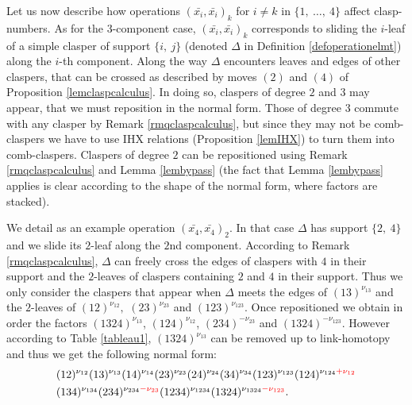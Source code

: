 \documentclass[11pt, a4paper, twoside,reqno]{amsart}
\begin{document}
Let us now describe how operations $(\bar{x_i},\bar{x_i})_k$ for $i\neq k$ in $\{1,\ \ldots,\ 4\}$ affect clasp-numbers. As for the $3$-component case, $(\bar{x_i},\bar{x_i})_k$ corresponds to sliding the $i$-leaf of a simple clasper of support $\{i,\ j\}$ (denoted $\Delta$ in Definition \ref{defoperationelmt}) along the $i$-th component. Along the way $\Delta$ encounters leaves and edges of other claspers, that can be crossed as described by moves $(2)$ and $(4)$ of Proposition \ref{lemclaspcalculus}. In doing so, claspers of degree $2$ and $3$ may appear, that we must reposition in the normal form. Those of degree $3$ commute with any clasper by Remark \ref{rmqclaspcalculus}, but since they may not be comb-claspers we have to use IHX relations (Proposition \ref{lemIHX}) to turn them into comb-claspers. Claspers of degree $2$ can be repositioned using Remark \ref{rmqclaspcalculus} and Lemma \ref{lembypass} (the fact that Lemma \ref{lembypass} applies is clear according to the shape of the normal form, where factors are stacked).

We detail as an example operation $(\bar{x_4},\bar{x_4})_2$. In that case $\Delta$ has support $\{2,\ 4\}$ and we slide its $2$-leaf along the $2$nd component. According to Remark \ref{rmqclaspcalculus}, $\Delta$ can freely cross the edges of claspers with $4$ in their support and the $2$-leaves of claspers containing $2$ and $4$ in their support. Thus we only consider the claspers that appear when $\Delta$ meets the edges of $(13)^{\nu_{13}}$ and the $2$-leaves of $(12)^{\nu_{12}},$ $(23)^{\nu_{23}}$ and  $(123)^{\nu_{123}}$. Once repositioned we obtain in order the factors $(1324)^{\nu_{13}}$, $(124)^{\nu_{12}}$, $(234)^{-\nu_{23}}$ and $(1324)^{-\nu_{123}}$. However according to Table \ref{tableau1}, $(1324)^{\nu_{13}}$ can be removed up to link-homotopy and thus we get the following normal form: 
\begin{align*}
&(12)^{\nu_{12}}(13)^{\nu_{13}}(14)^{\nu_{14}}(23)^{\nu_{23}}(24)^{\nu_{24}}(34)^{\nu_{34}}(123)^{\nu_{123}}(124)^{\nu_{124}{\color{red}+\nu_{12}}}\\&(134)^{\nu_{134}}(234)^{\nu_{234}{\color{red}-\nu_{23}}}(1234)^{\nu_{1234}}(1324)^{\nu_{1324}{\color{red}-\nu_{123}}}.
\end{align*}
\end{document}

